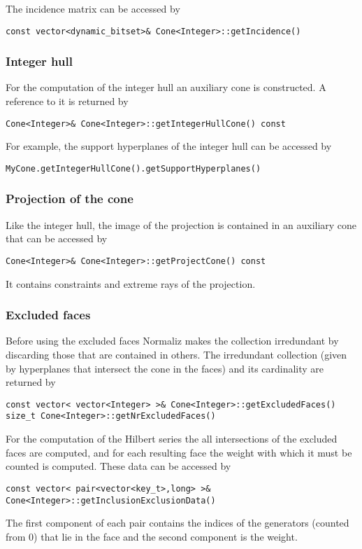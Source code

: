 \documentclass[12pt,a4paper]{scrartcl}
\theoremstyle{definition}
\begin{document}
\begin{small}
The incidence matrix can be accessed by

\begin{Verbatim}
const vector<dynamic_bitset>& Cone<Integer>::getIncidence()
\end{Verbatim}

\subsubsection{Integer hull}

For the computation of the integer hull an auxiliary cone is constructed. A reference to it is returned by
\begin{Verbatim}
Cone<Integer>& Cone<Integer>::getIntegerHullCone() const
\end{Verbatim}

For example, the support hyperplanes of the integer hull can be accessed by
\begin{Verbatim}
MyCone.getIntegerHullCone().getSupportHyperplanes()
\end{Verbatim}

\subsubsection{Projection of the cone}

Like the integer hull, the image of the projection is contained in an auxiliary cone that can be accessed by
\begin{Verbatim}
Cone<Integer>& Cone<Integer>::getProjectCone() const
\end{Verbatim}

It contains constraints and extreme rays of the projection.

\subsubsection{Excluded faces}

Before using the excluded faces Normaliz makes the collection irredundant by discarding those that are contained in others. The irredundant collection (given by hyperplanes that intersect the cone in the faces) and its cardinality are returned by
\begin{Verbatim}
const vector< vector<Integer> >& Cone<Integer>::getExcludedFaces()
size_t Cone<Integer>::getNrExcludedFaces()
\end{Verbatim}
For the computation of the Hilbert series the all intersections of the excluded faces are computed, and for each resulting face the weight with which it must be counted is computed. These data can be accessed by 
\begin{Verbatim}
const vector< pair<vector<key_t>,long> >& Cone<Integer>::getInclusionExclusionData()
\end{Verbatim}
The first component of each pair contains the indices of the generators (counted from 0) that lie in the face and the second component is the weight.


\end{small}
\end{document}

